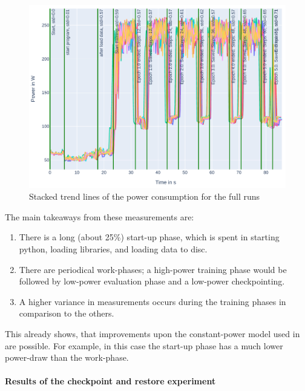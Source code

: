 \begin{figure}
    \includegraphics[width=\linewidth]{power-measurements/stacked_plots/roberta_full_0714.pdf}
    \caption{Stacked trend lines of the power consumption for the full runs}
    \label{fig:plot_full_stacked}
\end{figure}

The main takeaways from these measurements are:

\begin{enumerate}
    \item There is a long (about 25\%) start-up phase, which is spent in starting python, loading libraries, and loading data to disc.
    \item There are periodical work-phases; a high-power training phase would be followed by low-power evaluation phase and a low-power checkpointing.
    \item A higher variance in measurements occurs during the training phases in comparison to the others.
\end{enumerate}

This already shows, that improvements upon the constant-power model used in \cite{wiesner_lets_2021} are possible. 
For example, in this case the start-up phase has a much lower power-draw than the work-phase.

\paragraph{Results of the checkpoint and restore experiment}

